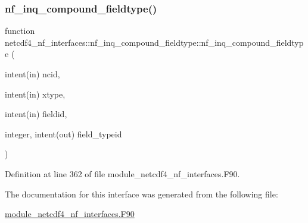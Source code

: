 \subsubsection{\texorpdfstring{nf\+\_\+inq\+\_\+compound\+\_\+fieldtype()}{nf\_inq\_compound\_fieldtype()}}
{\footnotesize\ttfamily function netcdf4\+\_\+nf\+\_\+interfaces\+::nf\+\_\+inq\+\_\+compound\+\_\+fieldtype\+::nf\+\_\+inq\+\_\+compound\+\_\+fieldtype (\begin{DoxyParamCaption}\item[{intent(in)}]{ncid,  }\item[{intent(in)}]{xtype,  }\item[{intent(in)}]{fieldid,  }\item[{integer, intent(out)}]{field\+\_\+typeid }\end{DoxyParamCaption})}



Definition at line 362 of file module\+\_\+netcdf4\+\_\+nf\+\_\+interfaces.\+F90.



The documentation for this interface was generated from the following file\+:\begin{DoxyCompactItemize}
\item 
\hyperlink{module__netcdf4__nf__interfaces_8F90}{module\+\_\+netcdf4\+\_\+nf\+\_\+interfaces.\+F90}\end{DoxyCompactItemize}
